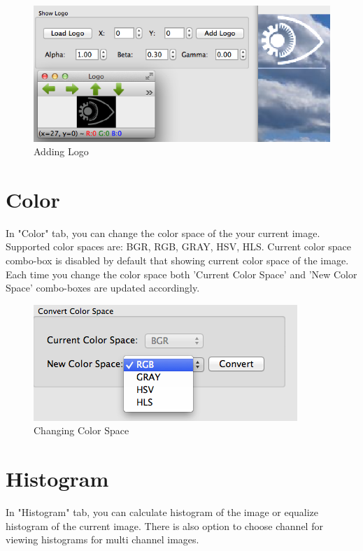 \documentclass{article}
\begin{document}
\begin{figure}[H]
\begin{center}
\includegraphics[scale=0.7]{toolboxLogo.png}
\caption{Adding Logo}
\end{center}
\end{figure}	


\section{Color}

In "Color" tab, you can change the color space of the your current image. Supported color spaces are: BGR, RGB, GRAY, HSV, HLS. Current color space combo-box is disabled by default that showing current color space of the image. Each time you change the color space both 'Current Color Space' and 'New Color Space' combo-boxes are updated accordingly.

\begin{figure}[H]
\begin{center}
\includegraphics[scale=0.7]{toolboxColorSpace.png}
\caption{Changing Color Space}
\end{center}
\end{figure}	

\section{Histogram}

In "Histogram" tab, you can calculate histogram of the image or equalize histogram of the current image. There is also option to choose channel for viewing histograms for multi channel images. 
\end{document}
